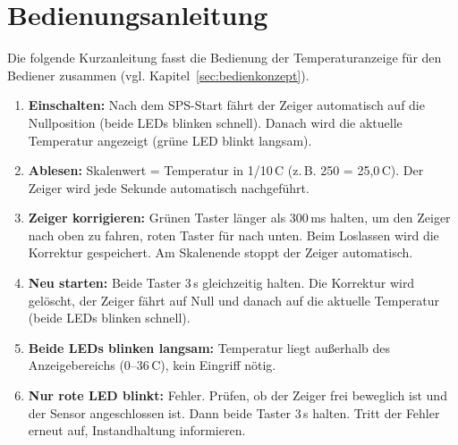 \section{Bedienungsanleitung}
\label{sec:bedienungsanleitung}
Die folgende Kurzanleitung fasst die Bedienung der Temperaturanzeige für den Bediener zusammen (vgl. Kapitel~\ref{sec:bedienkonzept}).

\begin{enumerate}[itemsep=2pt]
    \item \textbf{Einschalten:} Nach dem SPS-Start fährt der Zeiger automatisch auf die Nullposition (beide LEDs blinken schnell). Danach wird die aktuelle Temperatur angezeigt (grüne LED blinkt langsam).
    \item \textbf{Ablesen:} Skalenwert = Temperatur in 1/10\,\textdegree C (z.\,B. 250 = 25,0\,\textdegree C). Der Zeiger wird jede Sekunde automatisch nachgeführt.
    \item \textbf{Zeiger korrigieren:} Grünen Taster länger als 300\,ms halten, um den Zeiger nach oben zu fahren, roten Taster für nach unten. Beim Loslassen wird die Korrektur gespeichert. Am Skalenende stoppt der Zeiger automatisch.
    \item \textbf{Neu starten:} Beide Taster 3\,s gleichzeitig halten. Die Korrektur wird gelöscht, der Zeiger fährt auf Null und danach auf die aktuelle Temperatur (beide LEDs blinken schnell).
    \item \textbf{Beide LEDs blinken langsam:} Temperatur liegt außerhalb des Anzeigebereichs (0--36\,\textdegree C), kein Eingriff nötig.
    \item \textbf{Nur rote LED blinkt:} Fehler. Prüfen, ob der Zeiger frei beweglich ist und der Sensor angeschlossen ist. Dann beide Taster 3\,s halten. Tritt der Fehler erneut auf, Instandhaltung informieren.
\end{enumerate}

